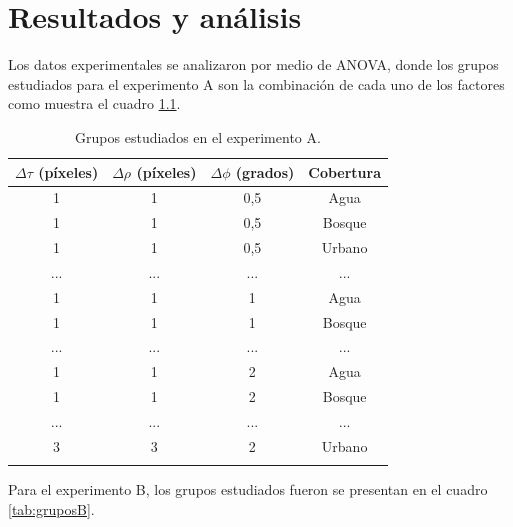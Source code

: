\chapter{Resultados y análisis} 

Los datos experimentales se analizaron por medio de ANOVA, donde los grupos estudiados para el experimento A son la combinación de cada uno de los factores como muestra el cuadro \ref{tab:gruposA}.\\

\begingroup
\renewcommand\arraystretch{0.75}
\begin{longtable}{|c|c|c|c|}

        \hline
        \textbf{$\Delta \tau$ (píxeles)} & \textbf{$\Delta \rho$ (píxeles)} & \textbf{$\Delta \phi$ (grados)} & \textbf{Cobertura} \\ 
        \hline
        \endhead
        1 & 1 & 0,5 & Agua \\ \hline
        1 & 1 & 0,5 & Bosque \\ \hline
        1 & 1 & 0,5 & Urbano \\ \hline
        ... & ... & ... & ... \\ \hline
        1 & 1 & 1 & Agua \\ \hline
        1 & 1 & 1 & Bosque \\ \hline
        ... & ... & ... & ... \\ \hline
        1 & 1 & 2 & Agua \\ \hline
        1 & 1 & 2 & Bosque \\ \hline
        ... & ... & ... & ... \\ \hline
        3 & 3 & 2 & Urbano \\ \hline
        
    
    \caption{Grupos estudiados en el experimento A.}
    \label{tab:gruposA}
\end{longtable}
\endgroup


Para el experimento B, los grupos estudiados fueron se presentan en el cuadro \ref{tab:gruposB}.\\

